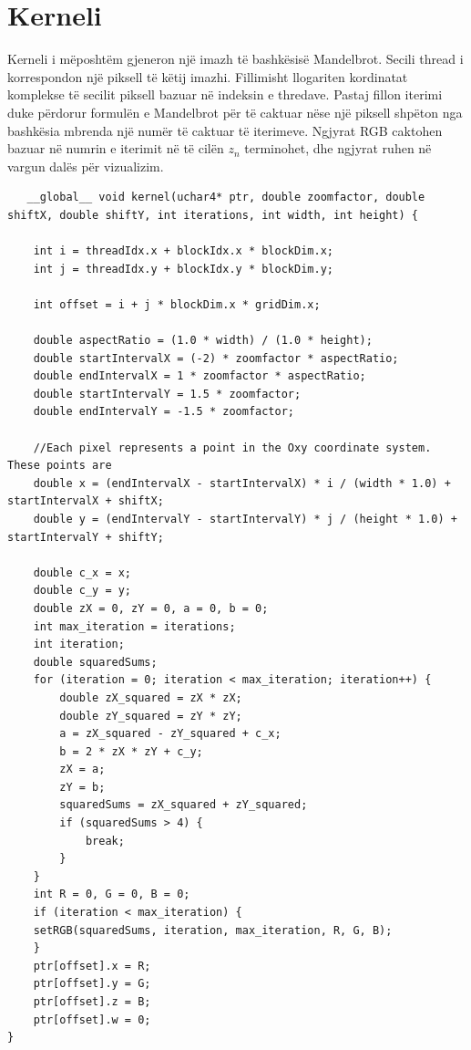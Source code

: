 \newpage
\section{Kerneli}
Kerneli i mëposhtëm gjeneron një imazh të bashkësisë Mandelbrot. Secili thread i korrespondon një piksell të këtij imazhi. Fillimisht llogariten kordinatat komplekse të secilit piksell bazuar në indeksin e thredave. Pastaj fillon iterimi duke përdorur formulën e Mandelbrot për të caktuar nëse një piksell shpëton nga bashkësia mbrenda një numër të caktuar të iterimeve. Ngjyrat RGB caktohen bazuar në numrin e iterimit në të cilën \(z_n\) terminohet, dhe ngjyrat ruhen në vargun dalës për vizualizim. \\

\begin{lstlisting}
   __global__ void kernel(uchar4* ptr, double zoomfactor, double shiftX, double shiftY, int iterations, int width, int height) {

    int i = threadIdx.x + blockIdx.x * blockDim.x;
    int j = threadIdx.y + blockIdx.y * blockDim.y;
        
    int offset = i + j * blockDim.x * gridDim.x;
        
    double aspectRatio = (1.0 * width) / (1.0 * height);
    double startIntervalX = (-2) * zoomfactor * aspectRatio;
    double endIntervalX = 1 * zoomfactor * aspectRatio;
    double startIntervalY = 1.5 * zoomfactor;
    double endIntervalY = -1.5 * zoomfactor;
        
    //Each pixel represents a point in the Oxy coordinate system. These points are 
    double x = (endIntervalX - startIntervalX) * i / (width * 1.0) + startIntervalX + shiftX;
    double y = (endIntervalY - startIntervalY) * j / (height * 1.0) + startIntervalY + shiftY;
        
    double c_x = x;
    double c_y = y;
    double zX = 0, zY = 0, a = 0, b = 0;
    int max_iteration = iterations;
    int iteration;
    double squaredSums;
    for (iteration = 0; iteration < max_iteration; iteration++) {
        double zX_squared = zX * zX;
        double zY_squared = zY * zY;
        a = zX_squared - zY_squared + c_x;
        b = 2 * zX * zY + c_y;
        zX = a;
        zY = b;
        squaredSums = zX_squared + zY_squared;
        if (squaredSums > 4) {
            break;
        }
    }
    int R = 0, G = 0, B = 0;
    if (iteration < max_iteration) {
    setRGB(squaredSums, iteration, max_iteration, R, G, B);
    }
    ptr[offset].x = R;
    ptr[offset].y = G;
    ptr[offset].z = B;
    ptr[offset].w = 0;
} 
\end{lstlisting}

